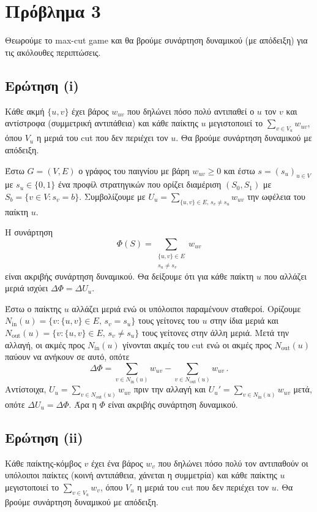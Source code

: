 \section{Πρόβλημα 3}

Θεωρούμε το max-cut game και θα βρούμε συνάρτηση δυναμικού (με απόδειξη) για τις
ακόλουθες περιπτώσεις.

\subsection{Ερώτηση (i)}

Κάθε ακμή $\{u, v\}$ έχει βάρος $w_{uv}$ που δηλώνει πόσο πολύ αντιπαθεί ο $u$ τον $v$
και αντίστροφα (συμμετρική αντιπάθεια) και κάθε παίκτης $u$ μεγιστοποιεί το
$\sum_{v \in V_u} w_{uv}$, όπου $V_u$ η μεριά του cut που δεν περιέχει τον $u$.
Θα βρούμε συνάρτηση δυναμικού με απόδειξη.

Έστω $G = (V, E)$ ο γράφος του παιγνίου με βάρη $w_{uv} \geq 0$ και έστω
$s = (s_u)_{u \in V}$ με $s_u \in \{0, 1\}$ ένα προφίλ στρατηγικών που ορίζει
διαμέριση $(S_0, S_1)$ με $S_b = \{v \in V : s_v = b\}$. Συμβολίζουμε με
$U_u = \sum_{\{u,v\} \in E,\, s_v \neq s_u} w_{uv}$ την ωφέλεια του παίκτη $u$.

Η συνάρτηση
$$
  \Phi(S) = \sum_{\substack{\{u,v\} \in E \\ s_u \neq s_v}} w_{uv}
$$
είναι ακριβής συνάρτηση δυναμικού. Θα δείξουμε ότι για κάθε παίκτη $u$ που
αλλάζει μεριά ισχύει $\Delta\Phi = \Delta U_u$.

Έστω ο παίκτης $u$ αλλάζει μεριά ενώ οι υπόλοιποι παραμένουν σταθεροί. Ορίζουμε
$N_{\mathrm{in}}(u) = \{v : \{u,v\} \in E,\, s_v = s_u\}$ τους γείτονες του $u$
στην ίδια μεριά και $N_{\mathrm{out}}(u) = \{v : \{u,v\} \in E,\, s_v \neq s_u\}$
τους γείτονες στην άλλη μεριά. Μετά την αλλαγή, οι ακμές προς $N_{\mathrm{in}}(u)$
γίνονται ακμές του cut ενώ οι ακμές προς $N_{\mathrm{out}}(u)$ παύουν να ανήκουν
σε αυτό, οπότε
$$
  \Delta\Phi = \sum_{v \in N_{\mathrm{in}}(u)} w_{uv} - \sum_{v \in N_{\mathrm{out}}(u)} w_{uv} \,.
$$
Αντίστοιχα, $U_u = \sum_{v \in N_{\mathrm{out}}(u)} w_{uv}$ πριν την αλλαγή και
$U_u' = \sum_{v \in N_{\mathrm{in}}(u)} w_{uv}$ μετά, οπότε $\Delta U_u = \Delta\Phi$.
Άρα η $\Phi$ είναι ακριβής συνάρτηση δυναμικού.

\subsection{Ερώτηση (ii)}

Κάθε παίκτης-κόμβος $v$ έχει ένα βάρος $w_v$ που δηλώνει πόσο πολύ τον αντιπαθούν
οι υπόλοιποι παίκτες (κοινή αντιπάθεια, χάνεται η συμμετρία) και κάθε παίκτης $u$
μεγιστοποιεί το $\sum_{v \in V_u} w_v$, όπου $V_u$ η μεριά του cut που δεν περιέχει
τον $u$. Θα βρούμε συνάρτηση δυναμικού με απόδειξη.


